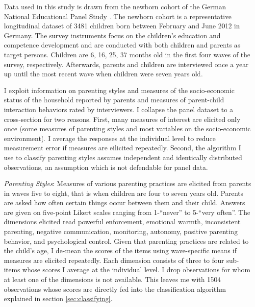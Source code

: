 Data used in this study is drawn from the newborn cohort of the German National Educational Panel Study \parencite{nepsnationaleducationalpanelstudybamberggermanyNEPSStartingCohort2021}. The newborn cohort is a representative longitudinal dataset of 3481 children born between February and June 2012 in Germany. The survey instruments focus on the children's education and competence development and are conducted with both children and parents as target persons. Children are 6, 16, 25, 37 months old in the first four waves of the survey, respectively. Afterwards, parents and children are interviewed once a year up until the most recent wave when children were seven years old. 

I exploit information on parenting styles and measures of the socio-economic status of the household reported by parents and measures of parent-child interaction behaviors rated by interviewers. I collapse the panel dataset to a cross-section for two reasons. First, many measures of interest are elicited only once (some measures of parenting styles and most variables on the socio-economic environment). I average the responses at the individual level to reduce measurement error if measures are eilicited repeatedly. Second, the algorithm I use to classify parenting styles assumes independent and identically distributed observations, an assumption which is not defendable for panel data.

\textit{Parenting Styles}: Measures of various parenting practices are elicited from parents in waves five to eight, that is when children are four to seven years old. Parents are asked how often certain things occur between them and their child. Answers are given on five-point Likert scales ranging from 1-``never'' to 5-``very often''. The dimensions elicited read powerful enforcement, emotional warmth, inconsistent parenting, negative communication, monitoring, autonomy, positive parenting behavior, and psychological control. Given that parenting practices are related to the child's age, I de-mean the scores of the items using wave-specific means if measures are elicited repeatedly. Each dimension consists of three to four sub-items whose scores I average at the individual level. I drop observations for whom at least one of the dimensions is not available. This leaves me with 1504 observations whose scores are directly fed into the classification algorithm explained in section \ref{sec:classifying}.

